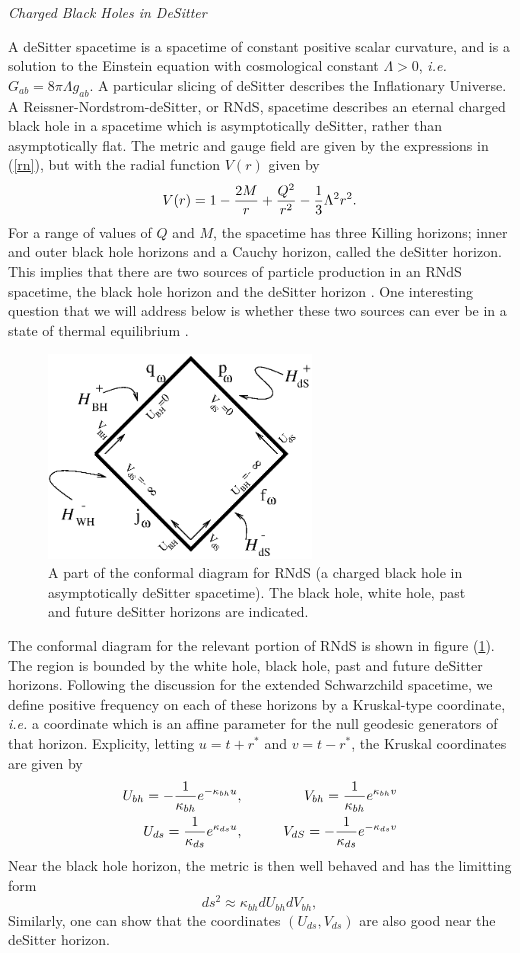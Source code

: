 \documentclass[12pt]{article}
\newcommand{\be}{\begin{equation}}
\newcommand{\ee}{\end{equation}}
\def\bena{\begin{eqnarray}}
\def\eena{\end{eqnarray}}
\def\ubh{U_{bh}}
\def\uds{U_{ds}}
\def\vds{V_{ds}}
\def\kbh{\kappa_{bh}}
\def\kds{\kappa_{ds}}
\begin{document}
\vskip 0.1in\noindent
{\it Charged Black Holes in DeSitter}
\vskip 0.05in

A deSitter spacetime is a spacetime of constant positive scalar curvature,
and is a solution to the Einstein equation with cosmological constant
$\Lambda >0$, {\it
i.e.} $G_{ab}=8\pi \Lambda g_{ab}$.  A particular slicing of deSitter
describes the
Inflationary Universe. A Reissner-Nordstrom-deSitter, or RNdS, spacetime
describes an eternal charged
black hole in a spacetime which is asymptotically deSitter, rather than
asymptotically flat.
The metric and gauge field are given by the expressions in (\ref{rn}), but
with the
radial function $V(r)$ given by
%
\be\label{rnds}
V(r)=1-{2M\over r} +{Q^2\over r^2} -{1\over 3}\Lambda ^2 r^2. \ee
%
For a range of values of $Q$ and $M$, the spacetime has three Killing horizons;
inner and outer black hole horizons and a Cauchy horizon, called the
deSitter horizon.
This implies that there are two sources of particle production in an RNdS
spacetime, the
black hole horizon and the deSitter horizon \cite{gh}.
One interesting question that we will address below is whether these two
sources can ever be
in a state of thermal equilibrium \cite{ktrnds}.
%
\begin{figure}[tb]
\begin{center}
\includegraphics[width=2.75in]{desitter.eps}
\end{center}
\caption{A part of the conformal diagram for RNdS (a charged black hole in
asymptotically
deSitter spacetime). The black hole, white hole, past and future deSitter
horizons
are indicated.}
\label{f5}
\end{figure}
%


The conformal diagram for the
relevant portion of RNdS is shown in figure (\ref{f5}). The region is bounded
by the white hole, black hole, past and future deSitter horizons.
Following the discussion for the extended Schwarzchild spacetime, we
define positive frequency on each of these horizons by a Kruskal-type
coordinate, {\it i.e.} a coordinate which is an affine parameter for the null
geodesic generators of that horizon.  Explicity, letting $u=t+r^*$ and
$v=t-r^*$, the
Kruskal coordinates are given by
%
\bena\label{kruskal}
\ubh =-{1\over {\kbh}}e^{-\kbh u}   ,&&\qquad V_{bh} ={1\over {\kbh}}
e^{\kbh v}\\
\uds={1\over \kds}e^{\kds u} ,&&\qquad V_{dS} =-{1\over \kds}e^{-\kds v} \eena
%
Near the black hole horizon, the metric is then well behaved and has the
limitting
form
%
\be\label{near}
ds^2 \approx \kbh d\ubh dV_{bh},\ee
%
Similarly, one can show that the coordinates $(\uds,\vds)$ are also good
near the deSitter horizon.
\end{document}
